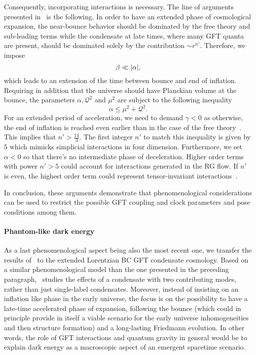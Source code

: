 \documentclass[11pt,a4paper]{article}
\begin{document}
Consequently, incorporating interactions is necessary. The line of arguments presented in~\cite{deCesare:2016rsf} is the following. In order to have an extended phase of cosmological expansion, the near-bounce behavior should be dominated by the free theory and sub-leading terms while the condensate at late times, where many GFT quanta are present, should be dominated solely by the contribution $\sim r^{n'}$. Therefore, we impose
%
\begin{equation}
\beta\ll\abs{\alpha},
\end{equation}
%
which leads to an extension of the time between bounce and end of inflation. Requiring in addition that the universe should have Planckian volume at the bounce, the parameters $\alpha,\mathcal{Q}^2$ and $\mu^2$ are subject to the following inequality~\cite{deCesare:2016rsf}
%
\begin{equation}
\alpha\leq \mu^2+\mathcal{Q}^2.
\end{equation}
%
For an extended period of acceleration, we need to demand $\gamma<0$ as otherwise, the end of inflation is reached even earlier than in the case of the free theory~\cite{deCesare:2016rsf}. This implies that $n'>\frac{14}{3}$. The first integer $n'$ to match this inequality is given by $5$ which mimicks simplicial interactions in four dimension. Furthermore, we set $\alpha<0$ so that there's no intermediate phase of deceleration. Higher order terms with power $n'>5$ could account for interactions generated in the RG flow. If $n'$ is even, the highest order term could represent tensor-invariant interactions~\cite{deCesare:2016rsf}.

In conclusion, these arguments demonstrate that phenomenological considerations can be used to restrict the possible GFT coupling and clock parameters and pose conditions among them.

\paragraph{Phantom-like dark energy}

As a last phenomenological aspect being also the most recent one, we transfer the results of~\cite{Oriti:2021rvm} to the extended Lorentzian BC GFT condensate cosmology. Based on a similar phenomenological model than the one presented in the preceding paragraph,~\cite{Oriti:2021rvm} studies the effects of a condensate with two contributing modes, rather than just single-label condensates. Moreover, instead of insisting on an inflation like phase in the early universe, the focus is on the possibility to have a late-time accelerated phase of expansion, following the bounce (which could in principle provide in itself a viable scenario for the early universe inhomogeneities and then structure formation) and a long-lasting Friedmann evolution. In other words, the role of GFT interactions and quantum gravity in general would be to explain dark energy as a macroscopic aspect of an emergent spacetime scenario. 
\end{document}
